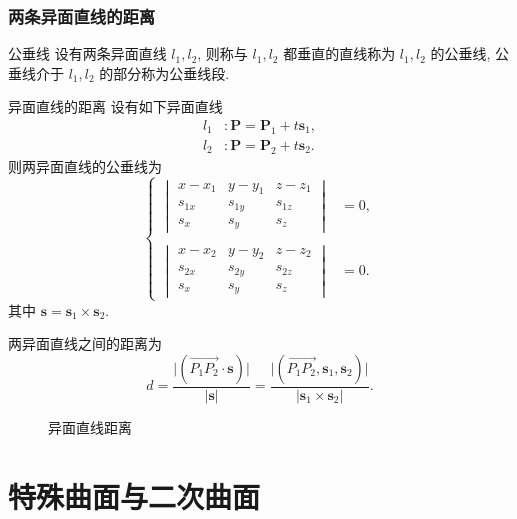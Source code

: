 \documentclass[cn,toc=twocol]{elegantbook}
\newcommand{\ve}[1]{\boldsymbol{#1}}
\newcommand{\Ve}[1]{\overrightarrow{#1}}
\newcommand{\FIGS}{
	\begin{figure}[H]
	\centering
}
\newcommand{\FIGE}{
	\end{figure}
}
\begin{document}
\subsection{两条异面直线的距离}

\begin{definition}{公垂线}
	设有两条异面直线 $l_1, l_2$, 则称与 $l_1, l_2$ 都垂直的直线称为 $l_1,l_2$ 的公垂线, 公垂线介于 $l_1,l_2$ 的部分称为公垂线段. 
\end{definition}

\begin{theorem}{异面直线的距离}
	设有如下异面直线
	\[
	\begin{aligned}
		l_1 &: \ve P = \ve P_1 + t \ve s_1,\\
		l_2 &: \ve P = \ve P_2 + t \ve s_2.
	\end{aligned}
	\]
	则两异面直线的公垂线为
	\[
	\begin{cases}
		\begin{vmatrix}
			x - x_1 & y - y_1 & z - z_1\\
			s_{1x} & s_{1y} & s_{1z}\\
			s_{x} & s_{y} & s_{z}
		\end{vmatrix} &= 0,\\
		\\
		\begin{vmatrix}
			x - x_2 & y - y_2 & z - z_2\\
			s_{2x} & s_{2y} & s_{2z}\\
			s_{x} & s_{y} & s_{z}
		\end{vmatrix} &= 0.
	\end{cases}
	\]
	其中 $\ve s = \ve s_1 \times \ve s_2$.
	
	两异面直线之间的距离为
	\[
		d = \frac{\lvert (\Ve{P_1P_2} \cdot \ve s) \rvert}{\lvert \ve s \rvert} = \frac{\lvert (\Ve{P_1P_2},\ve s_1, \ve s_2) \rvert}{\lvert \ve s_1 \times \ve s_2 \rvert}.
	\]
	
\end{theorem}


\FIGS
%
\caption{异面直线距离}
\FIGE



\chapter{特殊曲面与二次曲面}
\end{document}
